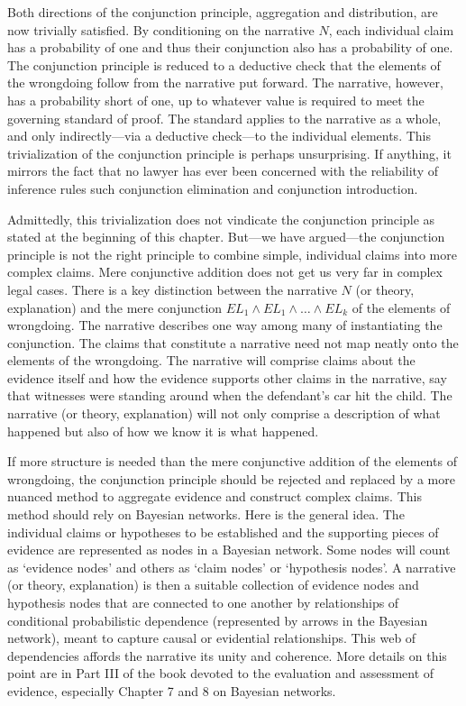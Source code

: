 \documentclass[
  10pt,
  dvipsnames,enabledeprecatedfontcommands]{scrartcl}
\begin{document}
Both directions of the conjunction principle, aggregation and
distribution, are now trivially satisfied. By conditioning on the
narrative \(N\), each individual claim has a probability of one and thus
their conjunction also has a probability of one. The conjunction
principle is reduced to a deductive check that the elements of the
wrongdoing follow from the narrative put forward. The narrative,
however, has a probability short of one, up to whatever value is
required to meet the governing standard of proof. The standard applies
to the narrative as a whole, and only indirectly---via a deductive
check---to the individual elements. This trivialization of the
conjunction principle is perhaps unsurprising. If anything, it mirrors
the fact that no lawyer has ever been concerned with the reliability of
inference rules such conjunction elimination and conjunction
introduction.

Admittedly, this trivialization does not vindicate the conjunction
principle as stated at the beginning of this chapter. But---we have
argued---the conjunction principle is not the right principle to combine
simple, individual claims into more complex claims. Mere conjunctive
addition does not get us very far in complex legal cases. There is a key
distinction between the narrative \(N\) (or theory, explanation) and the
mere conjunction \(EL_1\wedge EL_1 \wedge \dots \wedge EL_k\) of the
elements of wrongdoing. The narrative describes one way among many of
instantiating the conjunction. The claims that constitute a narrative
need not map neatly onto the elements of the wrongdoing. The narrative
will comprise claims about the evidence itself and how the evidence
supports other claims in the narrative, say that witnesses were standing
around when the defendant's car hit the child. The narrative (or theory,
explanation) will not only comprise a description of what happened but
also of how we know it is what happened.

If more structure is needed than the mere conjunctive addition of the
elements of wrongdoing, the conjunction principle should be rejected and
replaced by a more nuanced method to aggregate evidence and construct
complex claims. This method should rely on Bayesian networks. Here is
the general idea. The individual claims or hypotheses to be established
and the supporting pieces of evidence are represented as nodes in a
Bayesian network. Some nodes will count as `evidence nodes' and others
as `claim nodes' or `hypothesis nodes'. A narrative (or theory,
explanation) is then a suitable collection of evidence nodes and
hypothesis nodes that are connected to one another by relationships of
conditional probabilistic dependence (represented by arrows in the
Bayesian network), meant to capture causal or evidential relationships.
This web of dependencies affords the narrative its unity and coherence.
More details on this point are in Part III of the book devoted to the
evaluation and assessment of evidence, especially Chapter 7 and 8 on
Bayesian networks.
\end{document}
